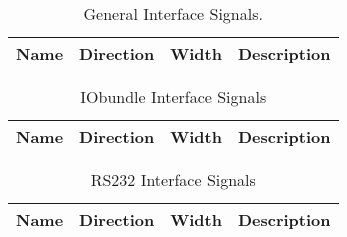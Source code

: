 %

\begin{table}[H]
  \centering
  \begin{tabular}{|l|l|r|p{10.5cm}|}

    \hline
    \rowcolor{iob-green}
    {\bf Name} & {\bf Direction} & {\bf Width} & {\bf Description}  \\ \hline \hline

    

  \end{tabular}
  \caption{General Interface Signals.}
  \label{gen_if_tab:is}
\end{table}

\begin{table}[H]
  \centering
  \begin{tabular}{|l|l|r|p{8.5cm}|}

    \hline
    \rowcolor{iob-green}
    {\bf Name} & {\bf Direction} & {\bf Width} & {\bf Description}  \\ \hline \hline

    

  \end{tabular}
  \caption{IObundle Interface Signals}
  \label{tab:if_iob_s}
\end{table}

\begin{table}[H]
  \centering
  \begin{tabular}{|l|l|r|p{9.5cm}|}
    
    \hline
    \rowcolor{iob-green}
    {\bf Name} & {\bf Direction} & {\bf Width} & {\bf Description}  \\ \hline \hline

    
 
  \end{tabular}
  \caption{RS232 Interface Signals}
  \label{tab:if_rs232}
\end{table}

%

